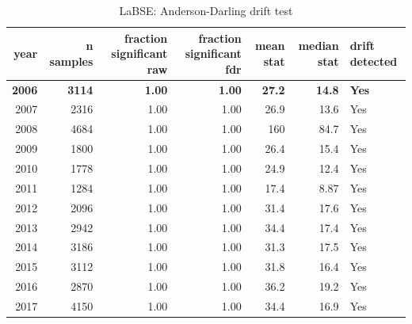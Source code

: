 \begin{table}[ht]
\centering
\caption{LaBSE: Anderson-Darling drift test}
\label{tab:labse_ad}
\begin{tabular}{rrrrrrl}
\toprule
year & n samples & fraction significant raw & fraction significant fdr & mean stat & median stat & drift detected \\
\midrule
\textbf{2006} & \textbf{3114} & \textbf{1.00} & \textbf{1.00} & \textbf{27.2} & \textbf{14.8} & \textbf{Yes} \\
2007 & 2316 & 1.00 & 1.00 & 26.9 & 13.6 & Yes \\
2008 & 4684 & 1.00 & 1.00 & 160 & 84.7 & Yes \\
2009 & 1800 & 1.00 & 1.00 & 26.4 & 15.4 & Yes \\
2010 & 1778 & 1.00 & 1.00 & 24.9 & 12.4 & Yes \\
2011 & 1284 & 1.00 & 1.00 & 17.4 & 8.87 & Yes \\
2012 & 2096 & 1.00 & 1.00 & 31.4 & 17.6 & Yes \\
2013 & 2942 & 1.00 & 1.00 & 34.4 & 17.4 & Yes \\
2014 & 3186 & 1.00 & 1.00 & 31.3 & 17.5 & Yes \\
2015 & 3112 & 1.00 & 1.00 & 31.8 & 16.4 & Yes \\
2016 & 2870 & 1.00 & 1.00 & 36.2 & 19.2 & Yes \\
2017 & 4150 & 1.00 & 1.00 & 34.4 & 16.9 & Yes \\
\bottomrule
\end{tabular}
\end{table}
